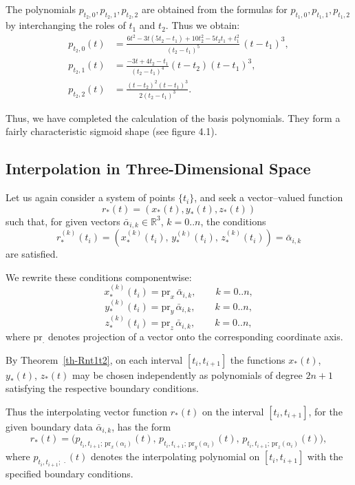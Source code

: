 \documentclass{article}
\theoremstyle{definition}
\theoremstyle{definition}
\numberwithin{figure}{section}
\newcommand{\1}{\mathbf{1}}
\begin{document}
The polynomials \(p_{t_2,0}, p_{t_2,1}, p_{t_2,2}\) are obtained from the formulas for  
\(p_{t_1,0}, p_{t_1,1}, p_{t_1,2}\) by interchanging the roles of \(t_1\) and \(t_2\).  
Thus we obtain:
\begin{align}\label{pt_2-0}
     p_{t_2,0}(t)
     &= \frac{
         6 t^{2} - 3 t (5 t_2 - t_1)
         + 10 t_2^{2} - 5 t_2 t_1 + t_1^{2}
     }{(t_2 - t_1)^{5}}\, (t - t_1)^{3},
     \\[6pt]\label{pt_2-1}
     p_{t_2,1}(t)
     &= \frac{-3 t + 4 t_2 - t_1}{(t_2 - t_1)^{4}}
        (t - t_2)(t - t_1)^{3},
     \\[6pt]\label{pt_2-2}
     p_{t_2,2}(t)
     &= \frac{(t - t_2)^{2}(t - t_1)^{3}}
        {2 (t_2 - t_1)^{3}}.
\end{align}

Thus, we have completed the calculation of the basis polynomials. They form a fairly characteristic sigmoid shape (see figure 4.1). 

\subsection{Interpolation in Three-Dimensional Space}

Let us again consider a system of points \(\{t_i\}\), and seek a vector–valued function  
\[
    r_*(t) = (x_*(t), y_*(t), z_*(t))
\]
such that, for given vectors \(\bar{\alpha}_{i,k} \in \mathbb{R}^3\), \(k = 0..n\), the conditions  
\[
    r_*^{(k)}(t_i) = (x_*^{(k)}(t_i),\, y_*^{(k)}(t_i),\, z_*^{(k)}(t_i)) = \bar{\alpha}_{i,k}
\]
are satisfied.

We rewrite these conditions componentwise:
\[
    x_*^{(k)}(t_i) = \mathrm{pr}_x\, \bar{\alpha}_{i,k}, \qquad k = 0..n,
\]
\[
    y_*^{(k)}(t_i) = \mathrm{pr}_y\, \bar{\alpha}_{i,k}, \qquad k = 0..n,
\]
\[
    z_*^{(k)}(t_i) = \mathrm{pr}_z\, \bar{\alpha}_{i,k}, \qquad k = 0..n,
\]
where \(\mathrm{pr}_{\cdot}\) denotes projection of a vector onto the corresponding coordinate axis.

By Theorem~\ref{th-Rnt1t2}, on each interval \([t_i, t_{i+1}]\) the functions \(x_*(t)\), \(y_*(t)\), \(z_*(t)\) may be chosen independently as polynomials of degree \(2n+1\) satisfying the respective boundary conditions.

Thus the interpolating vector function \(r_*(t)\) on the interval \([t_i, t_{i+1}]\), for the given boundary data \(\bar{\alpha}_{i,k}\), has the form
\[
    r_*(t)
    =
    \bigl(
        p_{t_i,t_{i+1};\, \mathrm{pr}_x(\alpha_i)}(t),\,
        p_{t_i,t_{i+1};\, \mathrm{pr}_y(\alpha_i)}(t),\,
        p_{t_i,t_{i+1};\, \mathrm{pr}_z(\alpha_i)}(t)
    \bigr),
\]
where \(p_{t_i,t_{i+1};\, \cdot}(t)\) denotes the interpolating polynomial on \([t_i,t_{i+1}]\) with the specified boundary conditions.
\end{document}
